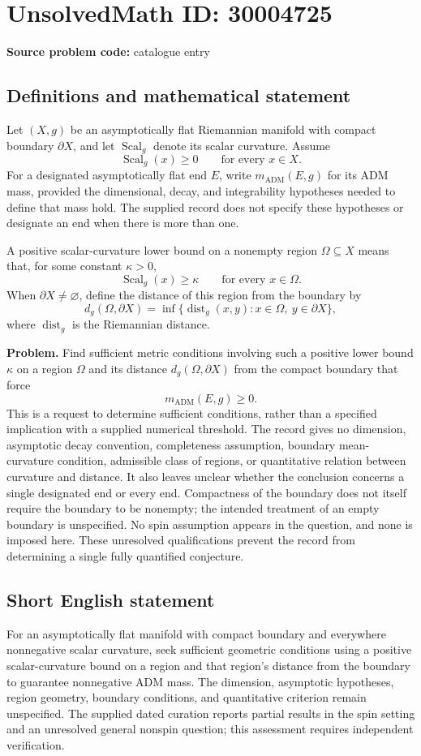 \documentclass[11pt]{article}
\begin{document}
\section*{UnsolvedMath ID: 30004725}
\textbf{Source problem code:} catalogue entry
\subsection{Definitions and mathematical statement}
Let \((X,g)\) be an asymptotically flat Riemannian manifold with compact boundary \(\partial X\), and let \(\operatorname{Scal}_g\) denote its scalar curvature. Assume
\[
\operatorname{Scal}_g(x)\geq 0\qquad\text{for every }x\in X.
\]
For a designated asymptotically flat end \(E\), write \(m_{\mathrm{ADM}}(E,g)\) for its ADM mass, provided the dimensional, decay, and integrability hypotheses needed to define that mass hold. The supplied record does not specify these hypotheses or designate an end when there is more than one.

A positive scalar-curvature lower bound on a nonempty region \(\Omega\subseteq X\) means that, for some constant \(\kappa>0\),
\[
\operatorname{Scal}_g(x)\geq\kappa\qquad\text{for every }x\in\Omega.
\]
When \(\partial X\neq\varnothing\), define the distance of this region from the boundary by
\[
d_g(\Omega,\partial X)
=\inf\{\operatorname{dist}_g(x,y):x\in\Omega,\ y\in\partial X\},
\]
where \(\operatorname{dist}_g\) is the Riemannian distance.

\textbf{Problem.} Find sufficient metric conditions involving such a positive lower bound \(\kappa\) on a region \(\Omega\) and its distance \(d_g(\Omega,\partial X)\) from the compact boundary that force
\[
m_{\mathrm{ADM}}(E,g)\geq 0.
\]
This is a request to determine sufficient conditions, rather than a specified implication with a supplied numerical threshold. The record gives no dimension, asymptotic decay convention, completeness assumption, boundary mean-curvature condition, admissible class of regions, or quantitative relation between curvature and distance. It also leaves unclear whether the conclusion concerns a single designated end or every end. Compactness of the boundary does not itself require the boundary to be nonempty; the intended treatment of an empty boundary is unspecified. No spin assumption appears in the question, and none is imposed here. These unresolved qualifications prevent the record from determining a single fully quantified conjecture.
\subsection{Short English statement}
For an asymptotically flat manifold with compact boundary and everywhere nonnegative scalar curvature, seek sufficient geometric conditions using a positive scalar-curvature bound on a region and that region's distance from the boundary to guarantee nonnegative ADM mass. The dimension, asymptotic hypotheses, region geometry, boundary conditions, and quantitative criterion remain unspecified. The supplied dated curation reports partial results in the spin setting and an unresolved general nonspin question; this assessment requires independent verification.
\end{document}
